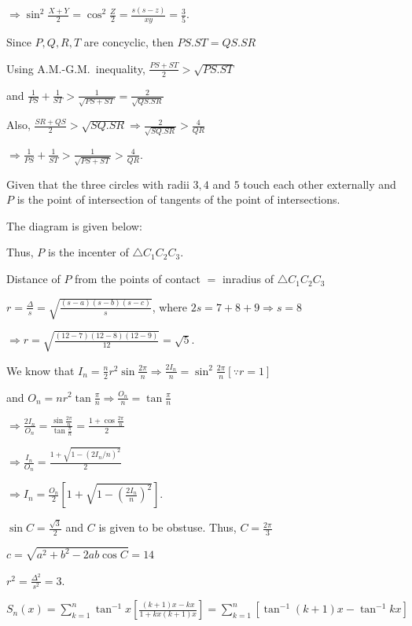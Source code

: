   $\Rightarrow \sin^2\frac{X + Y}{2} = \cos^2\frac{Z}{2} = \frac{s(s - z)}{xy} = \frac{3}{5}$.
\item Since $P, Q, R, T$ are concyclic, then $PS.ST = QS.SR$

  Using A.M.-G.M.\ inequality, $\frac{PS + ST}{2} > \sqrt{PS.ST}$

  and $\frac{1}{PS} + \frac{1}{ST} > \frac{1}{\sqrt{PS + ST}} = \frac{2}{\sqrt{QS.SR}}$

  Also, $\frac{SR + QS}{2} > \sqrt{SQ.SR}\Rightarrow \frac{2}{\sqrt{SQ.SR}} > \frac{4}{QR}$

  $\Rightarrow \frac{1}{PS} + \frac{1}{ST} > \frac{1}{\sqrt{PS + ST}} > \frac{4}{QR}$.
\item Given that the three circles with radii $3, 4$ and $5$ touch each other externally and $P$ is the
  point of intersection of tangents of the point of intersections.

  The diagram is given below:

  \startplacefigure
    \externalfigure[17_24.pdf]
  \stopplacefigure

  Thus, $P$ is the incenter of $\triangle C_1C_2C_3$.

  Distance of $P$ from the points of contact $=$ inradius of $\triangle C_1C_2C_3$

  $r = \frac{\Delta}{s} = \sqrt{\frac{(s - a)(s - b)(s - c)}{s}}$, where $2s = 7 + 8 + 9 \Rightarrow s = 8$

  $\Rightarrow r = \sqrt{\frac{(12 - 7)(12 - 8)(12 - 9)}{12}} = \sqrt{5}$.
\item We know that $I_n = \frac{n}{2}r^2\sin\frac{2\pi}{n}\Rightarrow \frac{2I_n}{n}
  = \sin^2\frac{2\pi}{n}[\because r = 1]$

  and $O_n = nr^2\tan\frac{\pi}{n}\Rightarrow \frac{O_n}{n} = \tan\frac{\pi}{n}$

  $\Rightarrow \frac{2I_n}{O_n} = \frac{\sin\frac{2\pi}{n}}{\tan\frac{\pi}{n}} = \frac{1
    + \cos\frac{2\pi}{n}}{2}$

  $\Rightarrow \frac{I_n}{O_n} = \frac{1 + \sqrt{1 - \left(2I_n/n\right)^2}}{2}$

  $\Rightarrow I_n = \frac{O_n}{2}\left[1 + \sqrt{1 - \left(\frac{2I_n}{n}\right)^2}\right]$.
\item $\sin C = \frac{\sqrt{3}}{2}$ and $C$ is given to be obstuse. Thus, $C = \frac{2\pi}{3}$

  $c = \sqrt{a^2 + b^2- 2ab\cos C} = 14$

  $r^2 = \frac{\Delta^2}{s^2} = 3$.
\item $S_n(x) = \displaystyle\sum_{k = 1}^n\tan^{-1}x\left[\frac{(k + 1)x - kx}{1 + kx(k + 1)x}\right]
  = \displaystyle\sum_{k = 1}^n\left[\tan^{-1}(k + 1)x - \tan^{-1}kx\right]$

